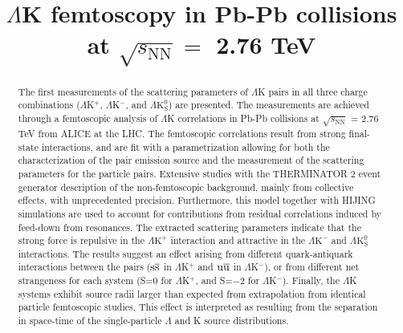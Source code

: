 \documentclass[ALICE,manyauthors]{cernphprep}
\newcommand{\LamK}{$\Lambda$K\xspace}
\newcommand{\LamKchP}{$\Lambda\mathrm{K^{+}}$\xspace}
\newcommand{\LamKchM}{$\Lambda\mathrm{K^{-}}$\xspace}
\newcommand{\LamKs}{$\Lambda\mathrm{K^{0}_{S}}$\xspace}
\begin{document}
%

\begin{titlepage}
%
%

\title{\LamK femtoscopy in Pb-Pb collisions at $\sqrt{s_{\mathrm{NN}}} = $ 2.76 TeV}
\ShortTitle{\LamK femtoscopy in Pb-Pb collisions}   %


\begin{abstract}
The first measurements of the scattering parameters of $\Lambda$K pairs in all three charge combinations ($\Lambda$K$^{+}$, $\Lambda$K$^{-}$, and $\Lambda\mathrm{K^{0}_{S}}$) are presented.
The measurements are achieved through a femtoscopic analysis of $\Lambda$K correlations in Pb-Pb collisions at $\sqrt{s_{\mathrm{NN}}}$ = 2.76 TeV from ALICE at the LHC.  
The femtoscopic correlations result from strong final-state interactions, and are fit with a parametrization allowing for both the characterization of the pair emission source and the measurement of the scattering parameters for the particle pairs.
Extensive studies with the THERMINATOR 2 event generator {\color{red}{allow for the}} {\color{blue}{provide a good}} description of the non-femtoscopic background, {\color{red}{resulting}} {\color{blue}{which result}} mainly from collective effects, with unprecedented precision.
Furthermore, this model together with HIJING simulations are used to account for contributions from residual correlations induced by feed-down from resonances.
The extracted scattering parameters indicate that the strong force is repulsive in the \LamKchP interaction and attractive in the \LamKchM and \LamKs interactions.
The results suggest an effect arising from different quark-antiquark interactions between the pairs ($\rm s\overline{s}$ in $\Lambda$K$^{+}$ and $\rm u\overline{u}$ in $\Lambda$K$^{-}$), or from different net strangeness for each system (S=0 for $\Lambda$K$^{+}$, and S=$-2$ for $\Lambda$K$^{-}$).
Finally, the $\Lambda$K systems exhibit source radii larger than expected from extrapolation from identical particle femtoscopic studies.
This effect is interpreted as resulting from the separation in space-time of the single-particle $\Lambda$ and K source distributions.
\end{abstract}
\end{titlepage}
\setcounter{page}{2}
\end{document}
